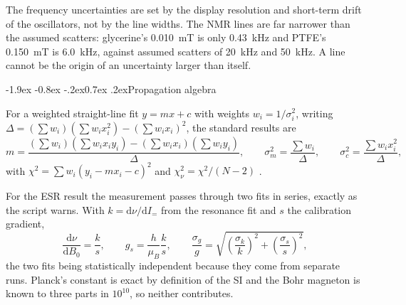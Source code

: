 \documentclass[11pt,a4paper]{article}
\makeatletter
\renewcommand\subsection{\@startsection{subsection}{2}{\z@}%
  {-1.9ex \@plus -0.8ex \@minus -.2ex}{0.7ex \@plus .2ex}{\normalfont\normalsize\bfseries}}
\makeatother
\begin{document}
The frequency uncertainties are set by the display resolution and short-term drift of the
oscillators, not by the line widths. The NMR lines are far narrower than the assumed scatters:
glycerine's \SI{0.010}{\milli\tesla} is only \SI{0.43}{\kilo\hertz} and PTFE's
\SI{0.150}{\milli\tesla} is \SI{6.0}{\kilo\hertz}, against assumed scatters of
\SI{20}{\kilo\hertz} and \SI{50}{\kilo\hertz}. A line cannot be the origin of an uncertainty
larger than itself.

\subsection{Propagation algebra}
\label{sec:effvar}

For a weighted straight-line fit $y = mx + c$ with weights $w_i = 1/\sigma_i^{2}$, writing
$\Delta = (\sum w_i)(\sum w_i x_i^{2}) - (\sum w_i x_i)^{2}$, the standard results are
\begin{equation}
m = \frac{(\sum w_i)(\sum w_i x_i y_i) - (\sum w_i x_i)(\sum w_i y_i)}{\Delta} ,
\qquad
\sigma_m^{2} = \frac{\sum w_i}{\Delta} ,
\qquad
\sigma_c^{2} = \frac{\sum w_i x_i^{2}}{\Delta} ,
\end{equation}
with $\chi^{2} = \sum w_i (y_i - m x_i - c)^{2}$ and $\chi^{2}_\nu = \chi^{2}/(N-2)$
\cite{taylor}.

For the ESR result the measurement passes through two fits in series, exactly as the script warns.
With $k = \mathrm{d}\nu/\mathrm{d}I_=$ from the resonance fit and $s$ the calibration gradient,
\begin{equation}
\frac{\mathrm{d}\nu}{\mathrm{d}B_0} = \frac{k}{s} ,
\qquad
g_s = \frac{h}{\mu_B}\frac{k}{s} ,
\qquad
\frac{\sigma_g}{g} = \sqrt{\left(\frac{\sigma_k}{k}\right)^{2} + \left(\frac{\sigma_s}{s}\right)^{2}} ,
\end{equation}
the two fits being statistically independent because they come from separate runs. Planck's
constant is exact by definition of the SI and the Bohr magneton is known to three parts in
$10^{10}$, so neither contributes.
\end{document}
